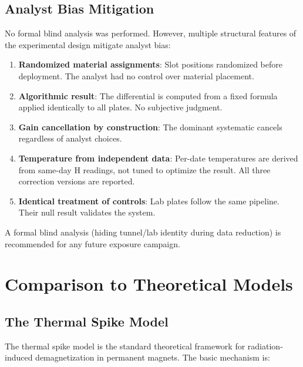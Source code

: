 \documentclass[11pt,letterpaper]{article}
\begin{document}
\subsection{Analyst Bias Mitigation}
\label{sec:bias}

No formal blind analysis was performed. However, multiple structural features
of the experimental design mitigate analyst bias:

\begin{enumerate}
    \item \textbf{Randomized material assignments}: Slot positions randomized
    before deployment. The analyst had no control over material placement.
    \item \textbf{Algorithmic result}: The differential is computed from a
    fixed formula applied identically to all plates. No subjective judgment.
    \item \textbf{Gain cancellation by construction}: The dominant systematic
    cancels regardless of analyst choices.
    \item \textbf{Temperature from independent data}: Per-date temperatures
    are derived from same-day H readings, not tuned to optimize the result.
    All three correction versions are reported.
    \item \textbf{Identical treatment of controls}: Lab plates follow the
    same pipeline. Their null result validates the system.
\end{enumerate}

A formal blind analysis (hiding tunnel/lab identity during data reduction) is
recommended for any future exposure campaign.

\section{Comparison to Theoretical Models}
\label{sec:theory}

\subsection{The Thermal Spike Model}
\label{sec:thermal_spike}

The thermal spike model \cite{Cost1988,Shen2018} is the standard theoretical
framework for radiation-induced demagnetization in permanent magnets. The basic
mechanism is:
\end{document}
